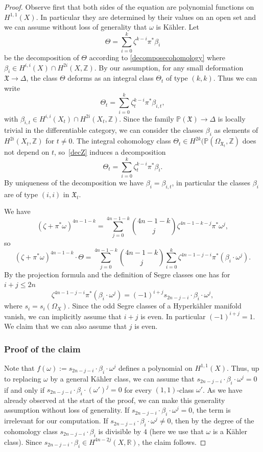 \documentclass[11pt]{article}
\theoremstyle{plain}
\theoremstyle{definition}
\newcommand{\R}{\ensuremath{\mathbb{R}}}
\newcommand{\Z}{\ensuremath{\mathbb{Z}}}
\newcommand{\PP}{\ensuremath{\mathbb{P}}}
\begin{document}
\begin{proof}
Observe first that both sides of the equation are polynomial functions on $H^{1,1}(X)$.
In particular they are determined by their values on an open set and we can assume
without loss of generality that $\omega$ is Kähler.
Let
\begin{equation} \label{decZ}
\Theta=\sum_{i=0}^{k} \zeta^{k-i} \pi^* \beta_{i}
\end{equation}
be the decomposition of $\Theta$ according to \eqref{decomposecohomology}
where $\beta_{i} \in H^{i,i} (X) \cap H^{2i}(X, \Z)$.
By our assumption, for any small deformation $\mathfrak X \to \Delta$, the class $\Theta$ deforms
as an integral class $\Theta_t$ of type $(k,k)$. Thus we can write
\[
\Theta_t=\sum_{i=0}^{k} \zeta_t^{k-i} \pi^* \beta_{i,t},
\]
with $\beta_{i,t} \in H^{i,i} (X_t) \cap H^{2i}(X_t, \Z)$. Since the family $\PP(\mathfrak X) \to \Delta$
is locally trivial in the differentiable category, we can consider the classes $\beta_{i}$ as elements of
$H^{2i}(X_t, \Z)$ for $t \neq 0$. The integral cohomology class $\Theta_t \in H^{2k}(\PP(\Omega_{\mathfrak X_t}, \Z)$ does not depend on $t$, so~\eqref{decZ} induces a decomposition
\[
\Theta_t=\sum_{i=0}^{k} \zeta_t^{k-i} \pi^* \beta_{i}.
\]
By uniqueness of the decomposition we have $\beta_i = \beta_{i,t}$, in particular the classes
$\beta_{i}$ are of type $(i,i)$ in $\mathfrak X_t$.

We have
\[
(\zeta+\pi^*\omega)^{4n-1-k}
=
\sum_{j=0}^{4n-1-k} \binom{4n-1-k}{j} \zeta^{4n-1-k-j} \pi^* \omega^j,
\]
so
\[
(\zeta+\pi^*\omega)^{4n-1-k} \cdot \Theta
=
\sum_{j=0}^{4n-1-k}
\binom{4n-1-k}{j}
\sum_{i=0}^{k} \zeta^{4n-1-j-i} \pi^* (\beta_{i} \cdot \omega^j)
.
\]
By the projection formula and the definition of Segre classes one has for $i+j \leq 2n$
\[
\zeta^{4n-1-j-i} \pi^* (\beta_{i} \cdot \omega^j)
=
(-1)^{i+j} s_{2n-j-i} \cdot \beta_{i} \cdot \omega^j,
\]
where $s_i=s_i(\Omega_X)$.
Since the odd Segre classes of a Hyperkähler manifold vanish, we can implicitly assume that
$i+j$ is even. In particular $(-1)^{i+j}=1$.
We claim that we can also assume that $j$ is even.

\subsubsection*{Proof of the claim}
Note that $f(\omega):=s_{2n-j-i} \cdot \beta_{i} \cdot \omega^j$ defines a polynomial on $H^{1,1}(X)$.
Thus, up to replacing $\omega$ by a general Kähler class, we can assume that $s_{2n-j-i} \cdot \beta_{i} \cdot \omega^j = 0$
if and only if $s_{2n-j-i} \cdot \beta_{i} \cdot (\omega')^j = 0$ for every $(1,1)$-class $\omega'$. As we have already observed at the start of the proof, we can make this generality assumption without loss of generality.
If $s_{2n-j-i} \cdot \beta_{i} \cdot \omega^j = 0$, the term is irrelevant for our computation.
If $s_{2n-j-i} \cdot \beta_{i} \cdot \omega^j \neq 0$,
then by \cite[Th.\,2.1]{Ver96} the degree of the cohomology class $s_{2n-j-i} \cdot \beta_{i}$ is divisible by $4$ (here we use that $\omega$ is a Kähler class).
Since $s_{2n-j-i} \cdot \beta_{i} \in H^{4n-2j}(X, \R)$, the claim follows.


\end{proof}
\end{document}
